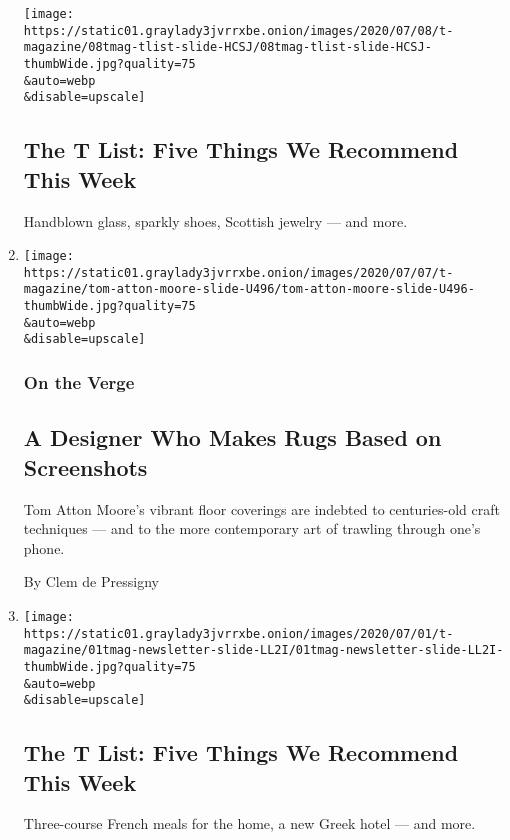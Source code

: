 \begin{enumerate}
  \texttt{[image: https://static01.graylady3jvrrxbe.onion/images/2020/07/08/t-magazine/08tmag-tlist-slide-HCSJ/08tmag-tlist-slide-HCSJ-thumbWide.jpg?quality=75\\\&auto=webp\\\&disable=upscale]}

  \hypertarget{the-t-list-five-things-we-recommend-this-week-2}{%
  \subsection{The T List: Five Things We Recommend This
  Week}\label{the-t-list-five-things-we-recommend-this-week-2}}

  Handblown glass, sparkly shoes, Scottish jewelry --- and more.
\item
  \href{/2020/07/07/t-magazine/tom-atton-moore.html}{}

  \texttt{[image: https://static01.graylady3jvrrxbe.onion/images/2020/07/07/t-magazine/tom-atton-moore-slide-U496/tom-atton-moore-slide-U496-thumbWide.jpg?quality=75\\\&auto=webp\\\&disable=upscale]}

  \hypertarget{on-the-verge}{%
  \subsubsection{On the Verge}\label{on-the-verge}}

  \hypertarget{a-designer-who-makes-rugs-based-on-screenshots}{%
  \subsection{A Designer Who Makes Rugs Based on
  Screenshots}\label{a-designer-who-makes-rugs-based-on-screenshots}}

  Tom Atton Moore's vibrant floor coverings are indebted to
  centuries-old craft techniques --- and to the more contemporary art of
  trawling through one's phone.

  By Clem de Pressigny
\item
  \href{/2020/07/02/t-magazine/kenzo-vans-tlist.html}{}

  \texttt{[image: https://static01.graylady3jvrrxbe.onion/images/2020/07/01/t-magazine/01tmag-newsletter-slide-LL2I/01tmag-newsletter-slide-LL2I-thumbWide.jpg?quality=75\\\&auto=webp\\\&disable=upscale]}

  \hypertarget{the-t-list-five-things-we-recommend-this-week-3}{%
  \subsection{The T List: Five Things We Recommend This
  Week}\label{the-t-list-five-things-we-recommend-this-week-3}}

  Three-course French meals for the home, a new Greek hotel --- and
  more.
\end{enumerate}

